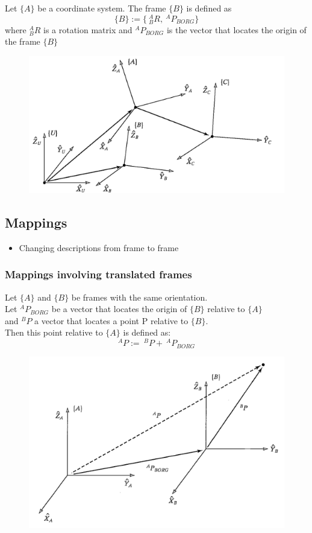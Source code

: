 \documentclass[10pt,a4paper]{article}
\begin{document}
Let $\{A\}$ be a coordinate system. The frame $\{B\}$ is defined as
\begin{equation*}
\{B\} := \{~^A_BR, ~^AP_{BORG}\}
\end{equation*}
where $^A_BR$ is a rotation matrix and $^AP_{BORG}$ is the vector that locates the origin of the frame $\{B\}$

\begin{figure}[H]
	\includegraphics[width=0.5\columnwidth]{imgs/frames}
\end{figure}

\subsection{Mappings}
\begin{itemize}
	\item Changing descriptions from frame to frame
\end{itemize}
\subsubsection{Mappings involving translated frames}
Let $\{A\}$ and $\{B\}$ be frames with the same orientation. \\
Let $^AP_{BORG}$ be a vector that locates the origin of $\{B\}$ relative to $\{A\}$ \\
and $^BP$ a vector that locates a point P relative to $\{B\}$. \\
Then this point relative to $\{A\}$ is defined as:
\begin{equation*}
^AP := ~^BP + ~^AP_{BORG}
\end{equation*}

\begin{figure}[H]
	\includegraphics[width=0.5\columnwidth]{imgs/translation}
\end{figure}
\end{document}
